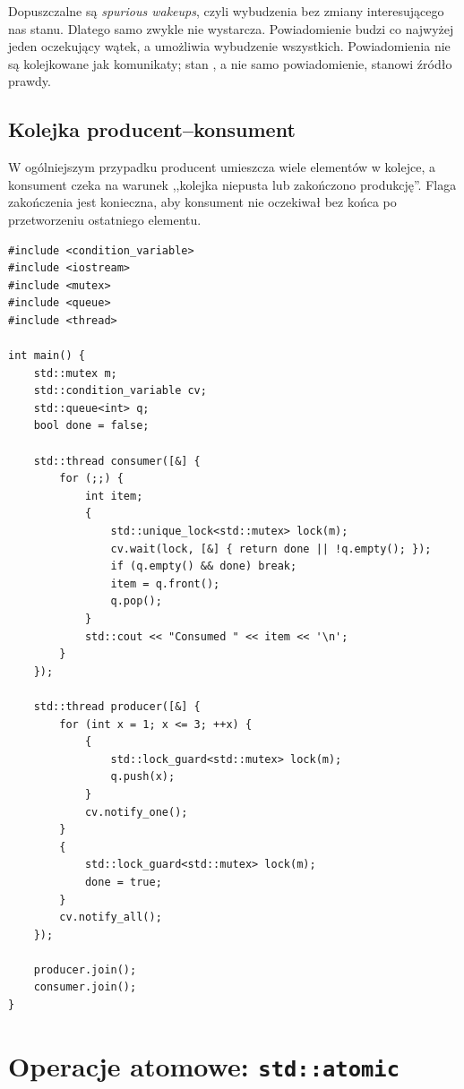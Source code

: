 Dopuszczalne są \emph{spurious wakeups}, czyli wybudzenia bez zmiany interesującego
nas stanu. Dlatego samo  zwykle nie wystarcza.
Powiadomienie  budzi co najwyżej jeden oczekujący wątek,
a  umożliwia wybudzenie wszystkich. Powiadomienia nie są
kolejkowane jak komunikaty; stan , a nie samo powiadomienie,
stanowi źródło prawdy.

\subsection{Kolejka producent--konsument}

W ogólniejszym przypadku producent umieszcza wiele elementów w kolejce,
a konsument czeka na warunek ,,kolejka niepusta lub zakończono produkcję''.
Flaga zakończenia jest konieczna, aby konsument nie oczekiwał bez końca
po przetworzeniu ostatniego elementu.

\begin{lstlisting}[caption={Współdzielona kolejka i sygnał zakończenia (C++11).}]
#include <condition_variable>
#include <iostream>
#include <mutex>
#include <queue>
#include <thread>

int main() {
    std::mutex m;
    std::condition_variable cv;
    std::queue<int> q;
    bool done = false;

    std::thread consumer([&] {
        for (;;) {
            int item;
            {
                std::unique_lock<std::mutex> lock(m);
                cv.wait(lock, [&] { return done || !q.empty(); });
                if (q.empty() && done) break;
                item = q.front();
                q.pop();
            }
            std::cout << "Consumed " << item << '\n';
        }
    });

    std::thread producer([&] {
        for (int x = 1; x <= 3; ++x) {
            {
                std::lock_guard<std::mutex> lock(m);
                q.push(x);
            }
            cv.notify_one();
        }
        {
            std::lock_guard<std::mutex> lock(m);
            done = true;
        }
        cv.notify_all();
    });

    producer.join();
    consumer.join();
}
\end{lstlisting}

\section{Operacje atomowe: \texttt{std::atomic}}
\label{sec:atomic}

